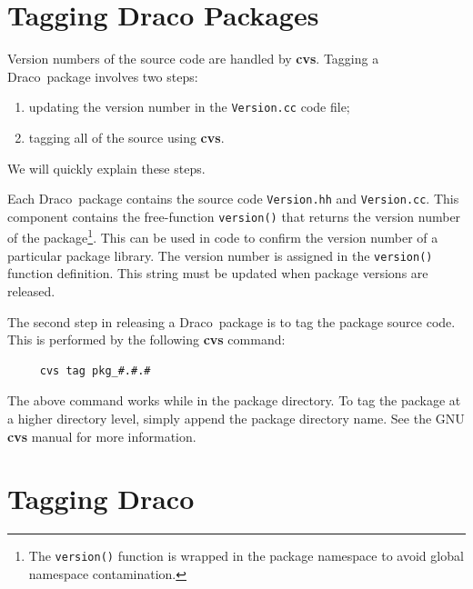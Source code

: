 \documentclass[11pt]{nmemo}
\newcommand{\draco}{\normalfont\normalsize\textsf Draco}
\begin{document}

\section{Tagging Draco Packages}

Version numbers of the source code are handled by {\bf cvs}.  Tagging
a \draco\ package involves two steps:
\begin{enumerate}
\item updating the version number in the \texttt{Version.cc} code
  file;
\item tagging all of the source using {\bf cvs}.
\end{enumerate}
We will quickly explain these steps.

Each \draco\ package contains the source code \texttt{Version.hh} and
\texttt{Version.cc}.  This component contains the free-function
\texttt{version()} that returns the version number of the
package\footnote{The \texttt{version()} function is wrapped in the
  package namespace to avoid global namespace contamination.}.  This
can be used in code to confirm the version number of a particular
package library.  The version number is assigned in the
\texttt{version()} function definition.  This string must be updated
when package versions are released.

The second step in releasing a \draco\ package is to tag the package
source code.  This is performed by the following {\bf cvs} command:
\begin{verbatim}
     cvs tag pkg_#.#.#
\end{verbatim}
The above command works while in the package directory.  To tag the
package at a higher directory level, simply append the package
directory name.  See the GNU {\bf cvs} manual for more information.


\section{Tagging Draco}
\end{document}
